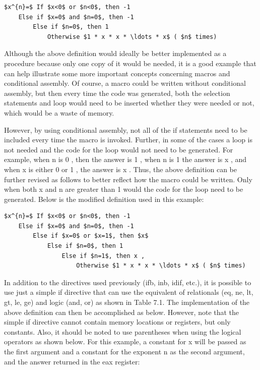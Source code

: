 \documentclass[10pt]{article}
\begin{document}
\begin{verbatim}
$x^{n}=$ If $x<0$ or $n<0$, then -1
    Else if $x=0$ and $n=0$, then -1
        Else if $n=0$, then 1
            Otherwise $1 * x * x * \ldots * x$ ( $n$ times)
\end{verbatim}

Although the above definition would ideally be better implemented as a procedure because only one copy of it would be needed, it is a good example that can help illustrate some more important concepts concerning macros and conditional assembly. Of course, a macro could be written without conditional assembly, but then every time the code was generated, both the selection statements and loop would need to be inserted whether they were needed or not, which would be a waste of memory.

However, by using conditional assembly, not all of the if statements need to be included every time the macro is invoked. Further, in some of the cases a loop is not needed and the code for the loop would not need to be generated. For example, when n is 0 , then the answer is 1 , when n is 1 the answer is x , and when x is either 0 or 1 , the answer is x . Thus, the above definition can be further revised as follows to better reflect how the macro could be written. Only when both x and n are greater than 1 would the code for the loop need to be generated. Below is the modified definition used in this example:

\begin{verbatim}
$x^{n}=$ If $x<0$ or $n<0$, then -1
    Else if $x=0$ and $n=0$, then -1
        Else if $x=0$ or $x=1$, then $x$
            Else if $n=0$, then 1
                Else if $n=1$, then x ,
                    Otherwise $1 * x * x * \ldots * x$ ( $n$ times)
\end{verbatim}

In addition to the directives used previously (ifb, inb, idif, etc.), it is possible to use just a simple if directive that can use the equivalent of relationals (eq, ne, lt, gt, le, ge) and logic (and, or) as shown in Table 7.1. The implementation of the above definition can then be accomplished as below. However, note that the simple if directive cannot contain memory locations or registers, but only constants. Also, it should be noted to use parentheses when using the logical operators as shown below. For this example, a constant for x will be passed as the first argument and a constant for the exponent n as the second argument, and the answer returned in the eax register:
\end{document}
